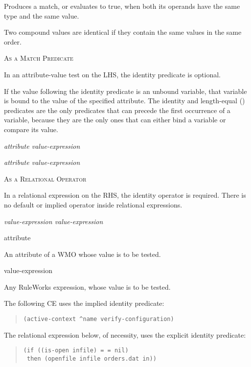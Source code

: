 Produces a match, or evaluates to true, when both its operands have
the same type and the same value.

Two compound values are identical if they contain the same values in
the same order.

\textsc{As a Match Predicate}

In an attribute-value test on the LHS, the identity predicate is
optional.

If the value following the identity predicate is an unbound variable,
that variable is bound to the value of the specified attribute. The
identity and length-equal (\co{[=]}) predicates are the only
predicates that can precede the first occurrence of a variable,
because they are the only ones that can either bind a variable or
compare its value.

\Format

\co{\^}\it{attribute} \co{==} \it{value-expression}

\co{\^}\it{attribute} \it{value-expression}

\textsc{As a Relational Operator}
\nopagebreak

In a relational expression on the RHS, the identity operator is
required. There is no default or implied operator inside relational
expressions.

\Format

\it{value-expression} \co{==} \it{value-expression}

\begin{operands}
\item[\ct attribute]

  An attribute of a WMO whose value is to be tested.

\item[value-expression]

  Any RuleWorks expression, whose value is to be tested.
\end{operands}

\Example

The following CE uses the implied identity predicate:

\begin{quote}
\begin{verbatim}
(active-context ^name verify-configuration)
\end{verbatim}
\end{quote}

The relational expression below, of necessity, uses the explicit
identity predicate:

\begin{quote}
\begin{verbatim}
(if ((is-open infile) = = nil)
 then (openfile infile orders.dat in))
\end{verbatim}
\end{quote}

